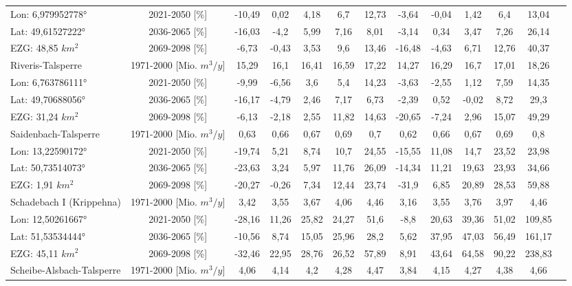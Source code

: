 \begin{longtable}{@{\extracolsep{\fill}}lc|ccccc||cccccc}
\cline{2-13} 
Lon: 6,979952778° & 2021-2050 [\%]  & -10,49 & 0,02 & 4,18 & 6,7 & 12,73 & -3,64 & -0,04 & 1,42 & 6,4 & 13,04 & \\ 
Lat: 49,61527222° & 2036-2065 [\%]  & -16,03 & -4,2 & 5,99 & 7,16 & 8,01 & -3,14 & 0,34 & 3,47 & 7,26 & 26,14 & \\ 
EZG: 48,85 $km^2$ & 2069-2098 [\%]  & -6,73 & -0,43 & 3,53 & 9,6 & 13,46 & -16,48 & -4,63 & 6,71 & 12,76 & 40,37 & \\ 
\hline 
Riveris-Talsperre & 1971-2000 [Mio. $m^3/y$]  & 15,29 & 16,1 & 16,41 & 16,59 & 17,22 & 14,27 & 16,29 & 16,7 & 17,01 & 18,26 & \\ 
\cline{2-13} 
Lon: 6,763786111° & 2021-2050 [\%]  & -9,99 & -6,56 & 3,6 & 5,4 & 14,23 & -3,63 & -2,55 & 1,12 & 7,59 & 14,35 & \\ 
Lat: 49,70688056° & 2036-2065 [\%]  & -16,17 & -4,79 & 2,46 & 7,17 & 6,73 & -2,39 & 0,52 & -0,02 & 8,72 & 29,3 & \\ 
EZG: 31,24 $km^2$ & 2069-2098 [\%]  & -6,13 & -2,18 & 2,55 & 11,82 & 14,63 & -20,65 & -7,24 & 2,96 & 15,07 & 49,29 & \\ 
\hline 
Saidenbach-Talsperre & 1971-2000 [Mio. $m^3/y$]  & 0,63 & 0,66 & 0,67 & 0,69 & 0,7 & 0,62 & 0,66 & 0,67 & 0,69 & 0,8 & \\ 
\cline{2-13} 
Lon: 13,22590172° & 2021-2050 [\%]  & -19,74 & 5,21 & 8,74 & 10,7 & 24,55 & -15,55 & 11,08 & 14,7 & 23,52 & 23,98 & \\ 
Lat: 50,73514073° & 2036-2065 [\%]  & -23,63 & 3,24 & 5,97 & 11,76 & 26,09 & -14,34 & 11,21 & 19,63 & 23,93 & 34,66 & \\ 
EZG: 1,91 $km^2$ & 2069-2098 [\%]  & -20,27 & -0,26 & 7,34 & 12,44 & 23,74 & -31,9 & 6,85 & 20,89 & 28,53 & 59,88 & \\ 
\hline 
Schadebach I (Krippehna) & 1971-2000 [Mio. $m^3/y$]  & 3,42 & 3,55 & 3,67 & 4,06 & 4,46 & 3,16 & 3,55 & 3,76 & 3,97 & 4,46 & \\ 
\cline{2-13} 
Lon: 12,50261667° & 2021-2050 [\%]  & -28,16 & 11,26 & 25,82 & 24,27 & 51,6 & -8,8 & 20,63 & 39,36 & 51,02 & 109,85 & \\ 
Lat: 51,53534444° & 2036-2065 [\%]  & -10,56 & 8,74 & 15,05 & 25,96 & 28,2 & 5,62 & 37,95 & 47,03 & 56,49 & 161,17 & \\ 
EZG: 45,11 $km^2$ & 2069-2098 [\%]  & -32,46 & 22,95 & 28,76 & 26,52 & 57,89 & 8,91 & 43,64 & 64,58 & 90,22 & 238,83 & \\ 
\hline 
Scheibe-Alsbach-Talsperre & 1971-2000 [Mio. $m^3/y$]  & 4,06 & 4,14 & 4,2 & 4,28 & 4,47 & 3,84 & 4,15 & 4,27 & 4,38 & 4,66 & \\ 

\end{longtable}
